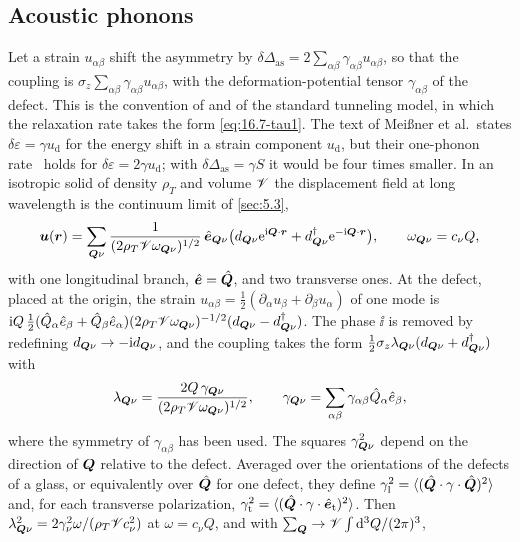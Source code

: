 \subsection*{Acoustic phonons}

Let a strain $u_{\alpha\beta}$ shift the asymmetry by $\delta\Delta_{\mathrm{as}} = 2\sum_{\alpha\beta}\gamma_{\alpha\beta}u_{\alpha\beta}$, so that the coupling is $\sigma_z\sum_{\alpha\beta}\gamma_{\alpha\beta}u_{\alpha\beta}$, with the deformation-potential tensor $\gamma_{\alpha\beta}$ of the defect. This is the convention of \cite[Eq.~(16)]{muller2019towards} and of the standard tunneling model, in which the relaxation rate takes the form \cref{eq:16.7-tau1}. The text of Meißner et al.\ states $\delta\varepsilon = \gamma u_{\mathrm{d}}$ for the energy shift in a strain component $u_{\mathrm{d}}$, but their one-phonon rate~\cite[Eq.~(7)]{meissner2021acoustic} holds for $\delta\varepsilon = 2\gamma u_{\mathrm{d}}$; with $\delta\Delta_{\mathrm{as}} = \gamma S$ it would be four times smaller. In an isotropic solid of density $\rho_T$ and volume $\mathscr{V}$ the displacement field at long wavelength is the continuum limit of \cref{sec:5.3},
\begin{equation*}
  \bm{u}(\bm{r}) = \sum_{\bm{Q}\nu}\frac{1}{(2\rho_T\mathscr{V}\omega_{\bm{Q}\nu})^{1/2}}\,\hat{\bm{e}}_{\bm{Q}\nu}\bigl(d_{\bm{Q}\nu}\mathrm{e}^{\mathrm{i}\bm{Q}\cdot\bm{r}} + d_{\bm{Q}\nu}^\dagger\mathrm{e}^{-\mathrm{i}\bm{Q}\cdot\bm{r}}\bigr) ,
  \qquad \omega_{\bm{Q}\nu} = c_\nu Q ,
\end{equation*}
with one longitudinal branch, $\hat{\bm{e}} = \hat{\bm{Q}}$, and two transverse ones. At the defect, placed at the origin, the strain $u_{\alpha\beta} = \tfrac12(\partial_\alpha u_\beta + \partial_\beta u_\alpha)$ of one mode is $\mathrm{i} Q\,\tfrac12(\hat Q_\alpha\hat e_\beta + \hat Q_\beta\hat e_\alpha)(2\rho_T\mathscr{V}\omega_{\bm{Q}\nu})^{-1/2}(d_{\bm{Q}\nu} - d_{\bm{Q}\nu}^\dagger)$. The phase $\ii$ is removed by redefining $d_{\bm{Q}\nu} \to -\mathrm{i} d_{\bm{Q}\nu}$, and the coupling takes the form $\tfrac12\sigma_z\lambda_{\bm{Q}\nu}(d_{\bm{Q}\nu} + d_{\bm{Q}\nu}^\dagger)$ with
\begin{equation*}
  \lambda_{\bm{Q}\nu} = \frac{2Q\,\gamma_{\bm{Q}\nu}}{(2\rho_T\mathscr{V}\omega_{\bm{Q}\nu})^{1/2}} , \qquad
  \gamma_{\bm{Q}\nu} = \sum_{\alpha\beta}\gamma_{\alpha\beta}\hat Q_\alpha\hat e_\beta ,
\end{equation*}
where the symmetry of $\gamma_{\alpha\beta}$ has been used. The squares $\gamma_{\bm{Q}\nu}^2$ depend on the direction of $\bm{Q}$ relative to the defect. Averaged over the orientations of the defects of a glass, or equivalently over $\hat{\bm{Q}}$ for one defect, they define $\gamma_{\mathrm{l}}^2 = \langle(\hat{\bm{Q}}\cdot\gamma\cdot\hat{\bm{Q}})^2\rangle$ and, for each transverse polarization, $\gamma_{\mathrm{t}}^2 = \langle(\hat{\bm{Q}}\cdot\gamma\cdot\hat{\bm{e}}_{\mathrm{t}})^2\rangle$. Then $\lambda_{\bm{Q}\nu}^2 = 2\gamma_\nu^2\omega/(\rho_T\mathscr{V} c_\nu^2)$ at $\omega = c_\nu Q$, and with $\sum_{\bm{Q}} \to \mathscr{V}\int\mathrm{d}^3Q/(2\pi)^3$,
